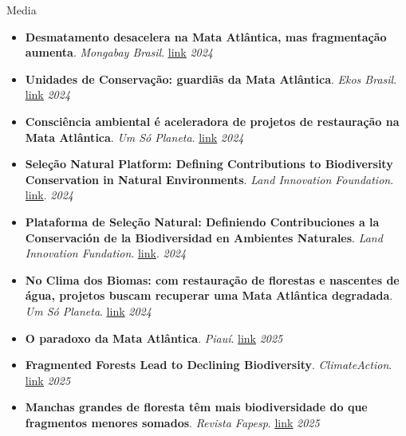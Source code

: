 \documentclass{resume}
\begin{document}
\begin{rSection}{Media}
\begin{itemize}
\item \textbf{Desmatamento desacelera na Mata Atlântica, mas fragmentação aumenta}. \textit{Mongabay Brasil}. \href{https://brasil.mongabay.com/2024/07/desmatamento-desacelera-na-mata-atlantica-mas-fragmentacao-aumenta}{\underline{link}} \hfill{\em 2024}
\item \textbf{Unidades de Conservação: guardiãs da Mata Atlântica}. \textit{Ekos Brasil}. \href{https://www.ekosbrasil.org/unidades-de-conservacao-guardias-da-mata-atlantica}{\underline{link}} \hfill{\em 2024}
\item \textbf{Consciência ambiental é aceleradora de projetos de restauração na Mata Atlântica}. \textit{Um Só Planeta}. \href{https://umsoplaneta.globo.com/clima/noticia/2024/09/26/consciencia-ambiental-e-aceleradora-de-projetos-de-restauracao-na-mata-atlantica.ghtml}{\underline{link}} \hfill{\em 2024}
\item \textbf{Seleção Natural Platform: Defining Contributions to Biodiversity Conservation in Natural Environments}. \textit{Land Innovation Foundation}. \href{https://www.landinnovation.fund/en/news/lif-forum-selecao-natural}{link}. \hfill{\em 2024}
\item \textbf{Plataforma de Seleção Natural: Definiendo Contribuciones a la Conservación de la Biodiversidad en Ambientes Naturales}. \textit{Land Innovation Fundation}. \href{https://www.landinnovation.fund/es/noticia/plenaria-lif-selecao-natural}{link}. \hfill{\em 2024}
\item \textbf{No Clima dos Biomas: com restauração de florestas e nascentes de água, projetos buscam recuperar uma Mata Atlântica degradada}. \textit{Um Só Planeta}. \href{https://umsoplaneta.globo.com/clima/noticia/2024/09/26/no-clima-dos-biomas-com-restauracao-de-florestas-e-nascentes-de-agua-projetos-buscam-recuperar-uma-mata-atlantica-degradada.ghtml}{\underline{link}} \hfill{\em 2024}
\item \textbf{O paradoxo da Mata Atlântica}. \textit{Piauí}. \href{https://piaui.folha.uol.com.br/paradoxo-mata-atlantica-crescimento/}{\underline{link}} \hfill{\em 2025}
\item \textbf{Fragmented Forests Lead to Declining Biodiversity}. \textit{ClimateAction}. \href{https://www.climateaction.org/news/fragmented-forests-lead-to-declining-biodiversity}{\underline{link}} \hfill{\em 2025}
\item \textbf{Manchas grandes de floresta têm mais biodiversidade do que fragmentos menores somados}. \textit{Revista Fapesp}. \href{https://revistapesquisa.fapesp.br/manchas-grandes-de-floresta-tem-mais-biodiversidade-do-que-fragmentos-menores-somados}{\underline{link}} \hfill{\em 2025}

\end{itemize}
\end{rSection}
\end{document}
